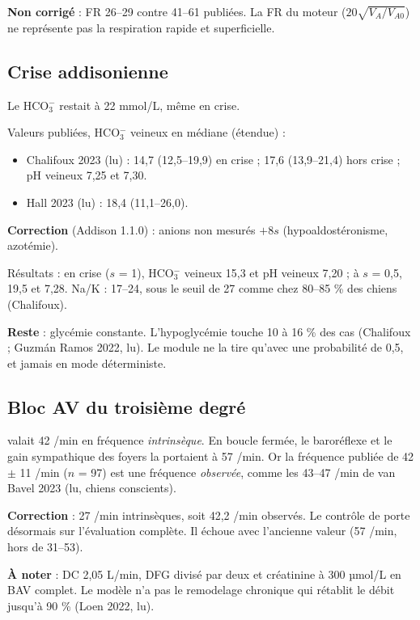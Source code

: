 \documentclass[10pt,a4paper]{article}
\newcommand{\vp}[1]{\path{#1}}
\begin{document}
\textbf{Non corrigé} : FR 26–29 contre 41–61 publiées. La FR du moteur ($20\sqrt{V_A/V_{A0}}$) ne représente pas la respiration rapide et superficielle.

\subsection{Crise addisonienne}
Le HCO$_3^-$ restait à 22 mmol/L, même en crise.

Valeurs publiées, HCO$_3^-$ veineux en médiane (étendue) :
\begin{itemize}
\item Chalifoux 2023 (lu) : 14,7 (12,5–19,9) en crise ; 17,6 (13,9–21,4) hors crise ; pH veineux 7,25 et 7,30.
\item Hall 2023 (lu) : 18,4 (11,1–26,0).
\end{itemize}

\textbf{Correction} (Addison 1.1.0) : anions non mesurés \vp{xa} $+8s$ (hypoaldostéronisme, azotémie).

Résultats : en crise ($s$ = 1), HCO$_3^-$ veineux 15,3 et pH veineux 7,20 ; à $s$ = 0,5, 19,5 et 7,28. Na/K : 17–24, sous le seuil de 27 comme chez 80–85 \% des chiens (Chalifoux).

\textbf{Reste} : glycémie constante. L'hypoglycémie touche 10 à 16 \% des cas (Chalifoux ; Guzmán Ramos 2022, lu). Le module ne la tire qu'avec une probabilité de 0,5, et jamais en mode déterministe.

\subsection{Bloc AV du troisième degré}
\vp{vent_escape_rate} valait 42 /min en fréquence \emph{intrinsèque}. En boucle fermée, le baroréflexe et le gain sympathique des foyers la portaient à 57 /min. Or la fréquence publiée de 42 $\pm$ 11 /min ($n$ = 97) est une fréquence \emph{observée}, comme les 43–47 /min de van Bavel 2023 (lu, chiens conscients).

\textbf{Correction} : 27 /min intrinsèques, soit 42,2 /min observés. Le contrôle de \vp{check_rhythm.py} porte désormais sur l'évaluation complète. Il échoue avec l'ancienne valeur (57 /min, hors de 31–53).

\textbf{À noter} : DC 2,05 L/min, DFG divisé par deux et créatinine à 300 µmol/L en BAV complet. Le modèle n'a pas le remodelage chronique qui rétablit le débit jusqu'à 90 \% (Loen 2022, lu).
\end{document}
